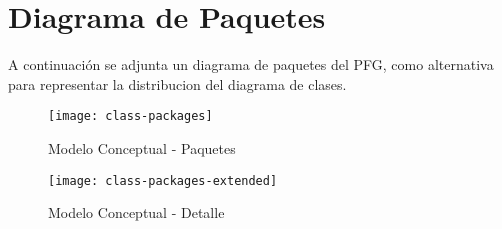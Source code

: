 \newpage
\appendix
\chapter{Diagrama de Paquetes}
A continuación se adjunta un diagrama de paquetes del PFG, como alternativa para representar la distribucion del diagrama de clases.
\begin{landscape}
     \begin{figure}[H]
        \centering
        \texttt{[image: class-packages]}
        \caption{Modelo Conceptual - Paquetes}
        \label{fig:CLASS-crop}
    \end{figure}
    
        \begin{figure}[H]
        \centering
        \texttt{[image: class-packages-extended]}
        \caption{Modelo Conceptual - Detalle}
        \label{fig:CLASS-brief}
    \end{figure}
\end{landscape}